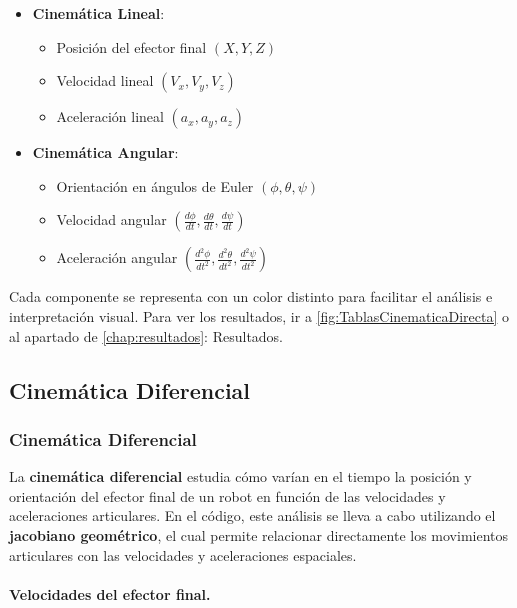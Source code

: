 \begin{itemize}
	\item \textbf{Cinemática Lineal}:
	\begin{itemize}
		\item Posición del efector final $(X, Y, Z)$
		\item Velocidad lineal $(V_x, V_y, V_z)$
		\item Aceleración lineal $(a_x, a_y, a_z)$
	\end{itemize}
	\item \textbf{Cinemática Angular}:
	\begin{itemize}
		\item Orientación en ángulos de Euler $(\phi, \theta, \psi)$
		\item Velocidad angular $\left(\frac{d\phi}{dt}, \frac{d\theta}{dt}, \frac{d\psi}{dt}\right)$
		\item Aceleración angular $\left(\frac{d^2\phi}{dt^2}, \frac{d^2\theta}{dt^2}, \frac{d^2\psi}{dt^2}\right)$
	\end{itemize}
\end{itemize}

Cada componente se representa con un color distinto para facilitar el análisis e interpretación visual. Para ver los resultados, ir a \autoref{fig:TablasCinematicaDirecta} o al apartado de \autoref{chap:resultados}: Resultados.

\subsection{Cinemática Diferencial}
\subsubsection{Cinemática Diferencial}

La \textbf{cinemática diferencial} estudia cómo varían en el tiempo la posición y orientación del efector final de un robot en función de las velocidades y aceleraciones articulares. En el código, este análisis se lleva a cabo utilizando el \textbf{jacobiano geométrico}, el cual permite relacionar directamente los movimientos articulares con las velocidades y aceleraciones espaciales.

\vspace{0.5em}
\paragraph{Velocidades del efector final.}

